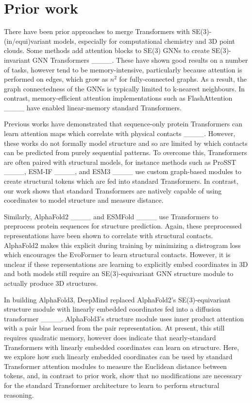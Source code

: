 \section{Prior work}
There have been prior approaches to merge Transformers with SE(3)-(in/equi)variant models, especially for computational chemistry and 3D point clouds.
Some methods add attention blocks to SE(3) GNNs to create SE(3)-invariant GNN Transformers ____.
These have shown good results on a number of tasks, however tend to be memory-intensive, particularly because attention is performed on edges, which grow as $n^2$ for fully-connected graphs.
As a result, the graph connectedness of the GNNs is typically limited to k-nearest neighbours.
In contrast, memory-efficient attention implementations such as FlashAttention ____ have enabled linear-memory standard Transformers.

Previous works have demonstrated that sequence-only protein Transformers can learn attention maps which correlate with physical contacts ____.
However, these works do not formally model structure and so are limited by which contacts can be predicted from purely sequential patterns.
To overcome this, Transformers are often paired with structural models, for instance methods such as ProSST ____, ESM-IF ____, and ESM3 ____ use custom graph-based modules to create structural tokens which are fed into standard Transformers.
In contrast, our work shows that standard Transformers are natively capable of using coordinates to model structure and measure distance.

Similarly, AlphaFold2 ____ and ESMFold ____ use Transformers to preprocess protein sequences for structure prediction.
Again, these preprocessed representations have been shown to correlate with structural contacts.
AlphaFold2 makes this explicit during training by minimizing a distrogram loss which encourages the EvoFormer to learn structural contacts.
However, it is unclear if these representations are learning to explicitly embed coordinates in 3D and both models still require an SE(3)-equivariant GNN structure module to actually produce 3D structures.

In building AlphaFold3, DeepMind replaced AlphaFold2's SE(3)-equivariant structure module with linearly embedded coordinates fed into a diffusion transformer ____.
AlphaFold3's structure module uses inner product attention with a pair bias learned from the pair representation.
At present, this still requires quadratic memory, however does indicate that nearly-standard Transformers with linearly embedded coordinates can learn on structure.
Here, we explore how such linearly embedded coordinates can be used by standard Transformer attention modules to measure the Euclidean distance between tokens, and, in contrast to prior work, show that no modifications are necessary for the standard Transformer architecture to learn to perform structural reasoning.
